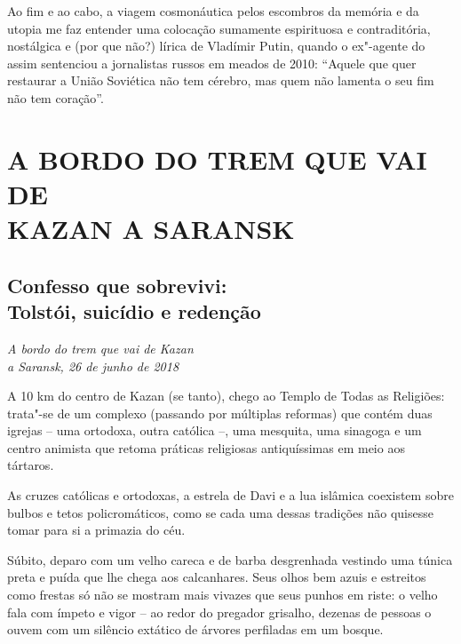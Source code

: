 Ao fim e ao cabo, a viagem cosmonáutica pelos escombros da memória e da
utopia me faz entender uma colocação sumamente espirituosa e
contraditória, nostálgica e (por que não?) lírica de Vladímir Putin,
quando o ex"-agente do  assim sentenciou a jornalistas russos em
meados de 2010: ``Aquele que quer restaurar a União Soviética não tem
cérebro, mas quem não lamenta o seu fim não tem coração''.

\clearpage{\pagestyle{empty}\cleardoublepage}
\movetooddpage
{}
\part*{A BORDO DO TREM QUE VAI DE\\KAZAN A SARANSK}

\chapter*{Confesso que sobrevivi:\\Tolstói, suicídio e redenção}

\begin{flushright}
\emph{A bordo do trem que vai de Kazan\\a Saransk, 26 de junho de 2018}
\end{flushright}

A 10 km do centro de Kazan (se tanto), chego ao Templo de Todas as
Religiões: trata"-se de um complexo (passando por múltiplas reformas) que
contém duas igrejas -- uma ortodoxa, outra católica --, uma mesquita,
uma sinagoga e um centro animista que retoma práticas religiosas
antiquíssimas em meio aos tártaros.

As cruzes católicas e ortodoxas, a estrela de Davi e a lua islâmica
coexistem sobre bulbos e tetos policromáticos, como se cada uma dessas
tradições não quisesse tomar para si a primazia do céu.

Súbito, deparo com um velho careca e de barba desgrenhada vestindo uma
túnica preta e puída que lhe chega aos calcanhares. Seus olhos bem azuis
e estreitos como frestas só não se mostram mais vivazes que seus punhos
em riste: o velho fala com ímpeto e vigor -- ao redor do pregador
grisalho, dezenas de pessoas o ouvem com um silêncio extático de árvores
perfiladas em um bosque.

